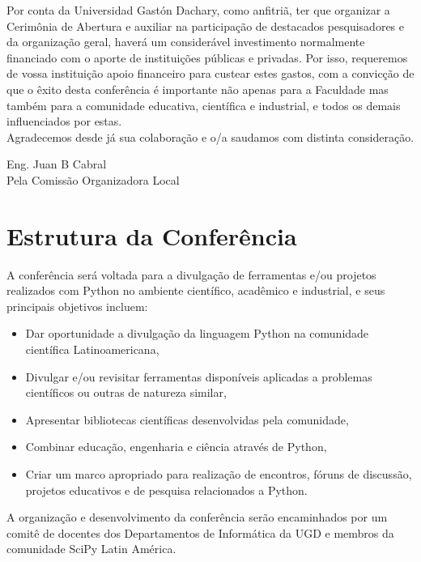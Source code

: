 \documentclass[11pt,a4paper]{report}
\begin{document}
Por conta da Universidad Gastón Dachary, como
anfitriã, ter que organizar a Cerimônia de Abertura e auxiliar
na participação de destacados pesquisadores e da organização geral, haverá um
considerável investimento normalmente financiado com o aporte de
instituições públicas e privadas. Por isso, requeremos de vossa
instituição apoio financeiro para custear estes gastos, com a convicção
de que o êxito desta conferência é importante não apenas para a
Faculdade mas também para a comunidade educativa, científica e industrial, e
todos os demais influenciados por estas.\\[0.1cm]

Agradecemos desde já sua colaboração e o/a saudamos
com distinta consideração.\\[0.1cm]



\begin{flushright}
Eng. Juan B Cabral\\
Pela Comissão Organizadora Local \\

\end{flushright}
\newpage
\section*{Estrutura da Conferência}

    A conferência será voltada para a divulgação de ferramentas e/ou
    projetos realizados com Python no ambiente científico, acadêmico e
    industrial, e seus principais objetivos incluem:

  \begin{itemize}
    \item Dar oportunidade a divulgação da linguagem Python na comunidade científica Latinoamericana,
    \item Divulgar e/ou revisitar ferramentas disponíveis aplicadas a problemas científicos ou outras de natureza similar,
    \item Apresentar bibliotecas científicas desenvolvidas pela comunidade,
    \item Combinar educação, engenharia e ciência através de Python,
    \item Criar um marco apropriado para realização de encontros, fóruns de discussão, projetos educativos e de pesquisa relacionados a Python.
  \end{itemize}

A organização e desenvolvimento da conferência serão encaminhados
por um comitê de docentes dos Departamentos de Informática da UGD e
membros da comunidade SciPy Latin América.\\
\end{document}
